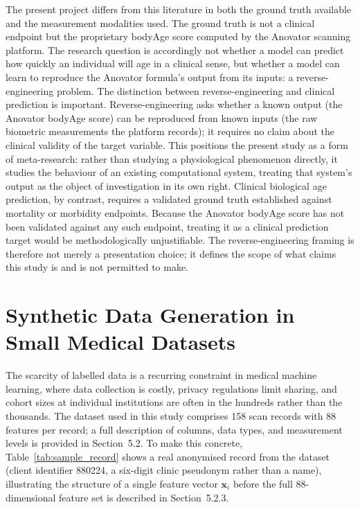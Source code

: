 \documentclass[11pt,a4paper]{report}
\begin{document}
The present project differs from this literature in both the ground truth available and the
measurement modalities used. The ground truth is not a clinical endpoint but the proprietary bodyAge
score computed by the Anovator scanning platform. The research question is accordingly not whether
a model can predict how quickly an individual will age in a clinical sense, but whether a model can
learn to reproduce the Anovator formula's output from its inputs: a reverse-engineering problem.
The distinction between reverse-engineering and clinical prediction is important.
Reverse-engineering asks whether a known output (the Anovator bodyAge score) can be reproduced
from known inputs (the raw biometric measurements the platform records); it requires no claim about
the clinical validity of the target variable. This positions the present study as a form of
meta-research: rather than studying a physiological phenomenon directly, it studies the behaviour of
an existing computational system, treating that system's output as the object of investigation in
its own right. Clinical biological age prediction, by contrast,
requires a validated ground truth established against mortality or morbidity endpoints. Because the
Anovator bodyAge score has not been validated against any such endpoint, treating it as a clinical
prediction target would be methodologically unjustifiable. The reverse-engineering framing is
therefore not merely a presentation choice; it defines the scope of what claims this study is and
is not permitted to make.

\section{Synthetic Data Generation in Small Medical Datasets}

The scarcity of labelled data is a recurring constraint in medical machine learning, where data
collection is costly, privacy regulations limit sharing, and cohort sizes at individual institutions
are often in the hundreds rather than the thousands. The dataset used in this study comprises 158
scan records with 88 features per record; a full description of columns, data types, and measurement
levels is provided in Section~5.2. To make this concrete, Table~\ref{tab:sample_record} shows a
real anonymised record from the dataset (client identifier 880224, a six-digit clinic pseudonym
rather than a name), illustrating the structure of a single feature vector $\mathbf{x}_i$ before
the full 88-dimensional feature set is described in Section~5.2.3.
\end{document}
